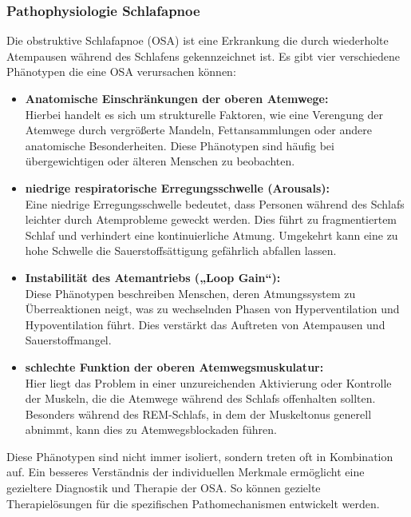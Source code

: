 \documentclass[a4paper, 12pt]{article}
\begin{document}
\subsubsection{Pathophysiologie Schlafapnoe}\label{schlafapnoe}
Die obstruktive Schlafapnoe (OSA) ist eine Erkrankung die durch wiederholte Atempausen während des Schlafens gekennzeichnet ist. Es gibt vier verschiedene Phänotypen die eine OSA verursachen können:
\begin{itemize}
\item \textbf{Anatomische Einschränkungen der oberen Atemwege:}\\
Hierbei handelt es sich um strukturelle Faktoren, wie eine Verengung der Atemwege durch vergrößerte Mandeln, Fettansammlungen oder andere anatomische Besonderheiten. Diese Phänotypen sind häufig bei übergewichtigen oder älteren Menschen zu beobachten.

\item \textbf{niedrige respiratorische Erregungsschwelle (Arousals):}\\
Eine niedrige Erregungsschwelle bedeutet, dass Personen während des Schlafs leichter durch Atemprobleme geweckt werden. Dies führt zu fragmentiertem Schlaf und verhindert eine kontinuierliche Atmung. Umgekehrt kann eine zu hohe Schwelle die Sauerstoffsättigung gefährlich abfallen lassen.

\item \textbf{Instabilität des Atemantriebs („Loop Gain“):}\\
Diese Phänotypen beschreiben Menschen, deren Atmungssystem zu Überreaktionen neigt, was zu wechselnden Phasen von Hyperventilation und Hypoventilation führt. Dies verstärkt das Auftreten von Atempausen und Sauerstoffmangel.

\item \textbf{schlechte Funktion der oberen Atemwegsmuskulatur:}\\
Hier liegt das Problem in einer unzureichenden Aktivierung oder Kontrolle der Muskeln, die die Atemwege während des Schlafs offenhalten sollten. Besonders während des REM-Schlafs, in dem der Muskeltonus generell abnimmt, kann dies zu Atemwegsblockaden führen.
\end{itemize}
Diese Phänotypen sind nicht immer isoliert, sondern treten oft in Kombination auf. Ein besseres Verständnis der individuellen Merkmale ermöglicht eine gezieltere Diagnostik und Therapie der OSA. So können gezielte Therapielösungen für die spezifischen Pathomechanismen entwickelt werden. \cite{OSA_Pathophysiology2019}
\end{document}
